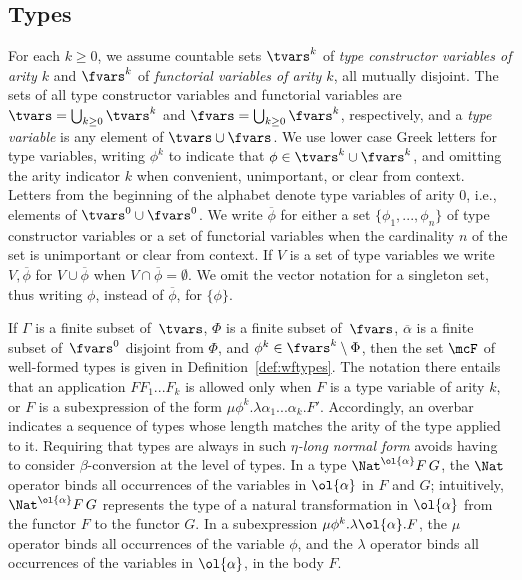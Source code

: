 \documentclass{lmcs}
\theoremstyle{plain}\newtheorem{satz}[thm]{Satz}
\begin{document}
\subsection{Types}
For each $k \ge 0$, we assume countable sets $\tvars^k$ of \emph{type
  constructor variables of arity $k$} and $\fvars^k$ of
\emph{functorial variables of arity $k$}, all mutually disjoint.  The
sets of all type constructor variables and functorial variables are
$\tvars = \bigcup_{k \ge 0} \tvars^k$ and $\fvars = \bigcup_{k \ge 0}
\fvars^k$, respectively, and a \emph{type variable} is any element of
$\tvars \cup \fvars$.  We use lower case Greek letters for type
variables, writing $\phi^k$ to indicate that $\phi \in \tvars^k \cup
\fvars^k$, and omitting the arity indicator $k$ when convenient,
unimportant, or clear from context. Letters from the beginning of the
alphabet denote type variables of arity $0$, i.e., elements of
$\tvars^0 \cup \fvars^0$. We write $\overline{\phi}$ for either a set
$\{\phi_1,...,\phi_n\}$ of type constructor variables or a set of
functorial variables when the cardinality $n$ of the set is
unimportant or clear from context. If $V$ is a set of type variables
we write $V, \overline{\phi}$ for $V \cup \overline{\phi}$ when $V
\cap \overline{\phi} = \emptyset$.  We omit the vector notation for a
singleton set, thus writing $\phi$, instead of $\overline{\phi}$, for
$\{\phi\}$.

If $\Gamma$ is a finite subset of\, $\tvars$, $\Phi$ is a finite
subset of\, $\fvars$, $\overline{\alpha}$ is a finite subset of\,
$\fvars^0$ disjoint from $\Phi$, and $\phi^k \in \fvars^k \setminus
\Phi$, then the set $\mcF$ of well-formed types is given in
Definition~\ref{def:wftypes}. The notation there entails that an
application $F F_1...F_k$ is allowed only when $F$ is a type variable
of arity $k$, or $F$ is a subexpression of the form $\mu
\phi^{k}.\lambda \alpha_1...\alpha_k.F'$. Accordingly, an overbar
indicates a sequence of types whose length matches the arity of the
type applied to it.  Requiring that types are always in such
\emph{$\eta$-long normal form} avoids having to consider
$\beta$-conversion at the level of types. In a type
$\Nat^{\ol{\alpha}}F\,G$, the $\Nat$ operator binds all occurrences of
the variables in $\ol{\alpha}$ in $F$ and $G$; intuitively,
$\Nat^{\ol{\alpha}}F\,G$ represents the type of a natural
transformation in $\ol{\alpha}$ from the functor $F$ to the functor
$G$.  In a subexpression $\mu \phi^k.\lambda \ol{\alpha}.F$, the $\mu$
operator binds all occurrences of the variable $\phi$, and the
$\lambda$ operator binds all occurrences of the variables in
$\ol{\alpha}$, in the body $F$.
\end{document}
